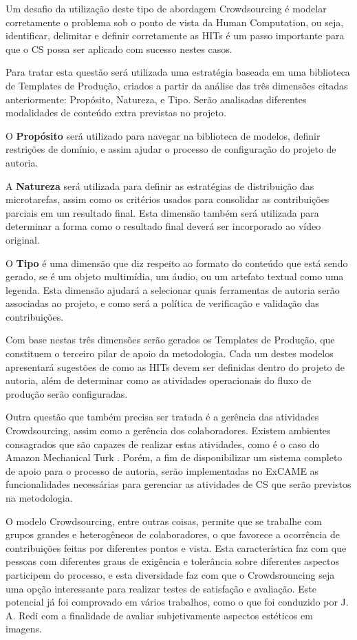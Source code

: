 \documentclass{sig-alternate}
\begin{document}
Um desafio da utilização deste tipo de abordagem Crowdsourcing é modelar corretamente o problema sob o ponto de vista da Human Computation, ou seja, identificar, delimitar e definir corretamente as HITs é um passo importante para que o CS possa ser aplicado com sucesso nestes casos.

Para tratar esta questão será utilizada uma estratégia baseada em uma biblioteca de Templates de Produção, criados a partir da análise das três dimensões citadas anteriormente: Propósito, Natureza, e Tipo. Serão analisadas diferentes modalidades de conteúdo extra previstas no projeto.

 O \textbf{Propósito} será utilizado para navegar na biblioteca de modelos, definir restrições de domínio, e assim ajudar o processo de configuração do projeto de autoria.

A \textbf{Natureza} será utilizada para definir as estratégias de distribuição das microtarefas, assim como os critérios usados para consolidar as contribuições parciais em um resultado final. Esta dimensão também será utilizada para determinar a forma como o resultado final deverá ser incorporado ao vídeo original.

O \textbf{Tipo} é uma dimensão que diz respeito ao formato do conteúdo que está sendo gerado, se é um objeto multimídia, um áudio, ou um artefato textual como uma legenda. Esta dimensão ajudará a selecionar quais ferramentas de autoria serão associadas ao projeto, e como será a política de verificação e validação das contribuições.

Com base nestas três dimensões serão gerados os Templates de Produção, que constituem o terceiro pilar de apoio da metodologia. Cada um destes modelos apresentará sugestões de como as HITs devem ser definidas dentro do projeto de autoria, além de determinar como as atividades operacionais do fluxo de produção serão configuradas.

Outra questão que também precisa ser tratada é a gerência das atividades Crowdsourcing, assim como a gerência dos colaboradores. Existem ambientes consagrados que são capazes de realizar estas atividades, como é o caso do Amazon Mechanical Turk \cite{Difallah:2015:DMC:2736277.2741685}. Porém, a fim de disponibilizar um sistema completo de apoio para o processo de autoria, serão implementadas no ExCAME as funcionalidades necessárias para gerenciar as atividades de CS que serão previstos na metodologia.


O modelo Crowdsourcing, entre outras coisas, permite que se trabalhe com grupos grandes e heterogêneos de colaboradores, o que favorece a ocorrência de contribuições feitas por diferentes pontos e vista. Esta característica faz com que pessoas com diferentes graus de exigência e tolerância sobre diferentes aspectos participem do processo, e esta diversidade faz com que o Crowdsrouncing seja uma opção interessante para realizar testes de satisfação e avaliação. Este potencial já foi comprovado em vários trabalhos, como o que foi conduzido por J. A. Redi \cite{Redi2013} com a finalidade de avaliar subjetivamente aspectos estéticos em imagens.
\end{document}
